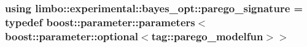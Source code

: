 \subsubsection[{parego\+\_\+signature}]{\setlength{\rightskip}{0pt plus 5cm}using {\bf limbo\+::experimental\+::bayes\+\_\+opt\+::parego\+\_\+signature} = typedef boost\+::parameter\+::parameters$<$boost\+::parameter\+::optional$<$tag\+::parego\+\_\+modelfun$>$$>$}\label{namespacelimbo_1_1experimental_1_1bayes__opt_acbfe5ad9b42be948de5ebb46bdc9dd01}
